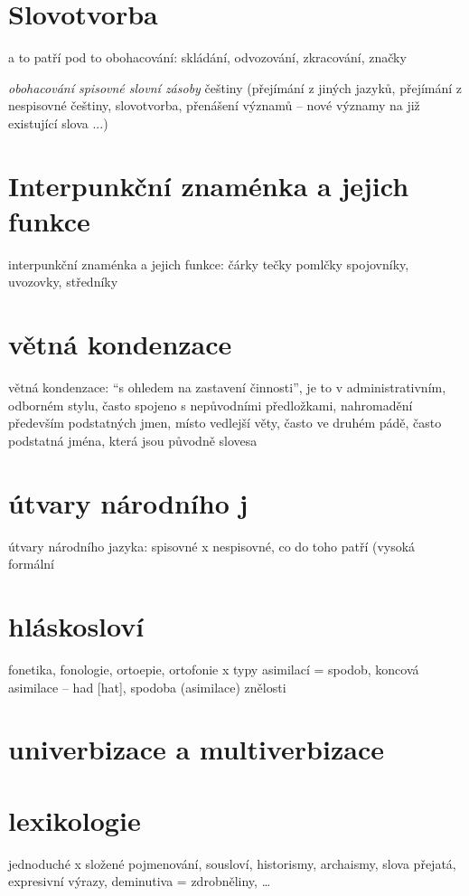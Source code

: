 \documentclass{memoir}
\begin{document}
\section*{Slovotvorba}
a to patří pod to obohacování: skládání, odvozování, zkracování, značky

\textit{obohacování spisovné slovní zásoby} češtiny (přejímání z jiných jazyků, přejímání z nespisovné češtiny, slovotvorba, přenášení významů – nové významy na již existující slova ...)

\section*{Interpunkční znaménka a jejich funkce}
interpunkční znaménka a jejich funkce: čárky tečky pomlčky spojovníky, uvozovky, středníky

\section*{větná kondenzace}
větná kondenzace: “s ohledem na zastavení činnosti”, je to v administrativním, odborném stylu, často spojeno s nepůvodními předložkami, nahromadění především podstatných jmen, místo vedlejší věty, často ve druhém pádě, často podstatná jména, která jsou původně slovesa

\section*{útvary národního j}
útvary národního jazyka: spisovné x nespisovné, co do toho patří (vysoká formální

\section*{hláskosloví}
fonetika, fonologie, ortoepie, ortofonie x typy asimilací = spodob, koncová asimilace – had [hat], spodoba (asimilace) znělosti

\section*{univerbizace a multiverbizace}

\section*{lexikologie}
jednoduché x složené pojmenování, sousloví, historismy, archaismy, slova přejatá, expresivní výrazy, deminutiva = zdrobněliny, …
\end{document}
